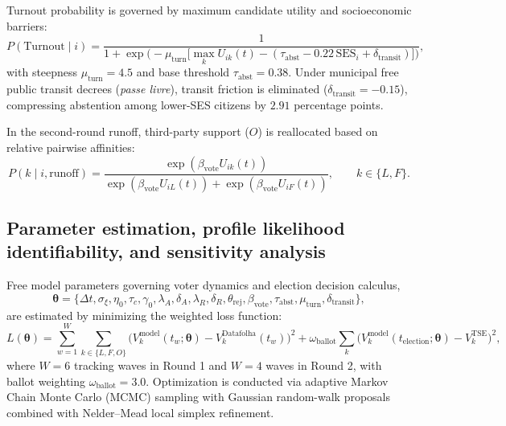 \documentclass[11pt,a4paper]{article}
\begin{document}
Turnout probability is governed by maximum candidate utility and socioeconomic barriers:
\begin{equation}
    P(\text{Turnout} \mid i) = \frac{1}{1 + \exp\!\big(-\mu_{\mathrm{turn}}\big[\max_k U_{ik}(t) - (\tau_{\mathrm{abst}} - 0.22\,\mathrm{SES}_i + \delta_{\mathrm{transit}})\big]\big)},
    \label{eq:turnout_probability}
\end{equation}
with steepness $\mu_{\mathrm{turn}} = 4.5$ and base threshold $\tau_{\mathrm{abst}} = 0.38$. Under municipal free public transit decrees (\emph{passe livre}), transit friction is eliminated ($\delta_{\mathrm{transit}} = -0.15$), compressing abstention among lower-SES citizens by $2.91$ percentage points.

In the second-round runoff, third-party support ($O$) is reallocated based on relative pairwise affinities:
\begin{equation}
    P(k \mid i, \text{runoff}) = \frac{\exp(\beta_{\mathrm{vote}} U_{ik}(t))}{\exp(\beta_{\mathrm{vote}} U_{iL}(t)) + \exp(\beta_{\mathrm{vote}} U_{iF}(t))}, \qquad k \in \{L, F\}.
    \label{eq:pairwise_logit_r2}
\end{equation}

\subsection{Parameter estimation, profile likelihood identifiability, and sensitivity analysis}
\label{sssec:identifiability_sensitivity}
Free model parameters governing voter dynamics and election decision calculus,
\begin{equation}
    \boldsymbol{\theta} = \big\{\Delta t, \sigma_{\xi}, \eta_0, \tau_c, \gamma_0, \lambda_A, \delta_A, \lambda_R, \delta_R, \theta_{\mathrm{rej}}, \beta_{\mathrm{vote}}, \tau_{\mathrm{abst}}, \mu_{\mathrm{turn}}, \delta_{\mathrm{transit}}\big\},
    \label{eq:free_parameters_vector}
\end{equation}
are estimated by minimizing the weighted loss function:
\begin{equation}
    L(\boldsymbol{\theta}) = \sum_{w=1}^W \sum_{k \in \{L, F, O\}} \big(V_k^{\mathrm{model}}(t_w; \boldsymbol{\theta}) - V_k^{\mathrm{Datafolha}}(t_w)\big)^2 + \omega_{\mathrm{ballot}} \sum_{k} \big(V_k^{\mathrm{model}}(t_{\mathrm{election}}; \boldsymbol{\theta}) - V_k^{\mathrm{TSE}}\big)^2,
    \label{eq:supp_loss_function}
\end{equation}
where $W = 6$ tracking waves in Round 1 and $W = 4$ waves in Round 2, with ballot weighting $\omega_{\mathrm{ballot}} = 3.0$. Optimization is conducted via adaptive Markov Chain Monte Carlo (MCMC) sampling with Gaussian random-walk proposals combined with Nelder--Mead local simplex refinement.
\end{document}
